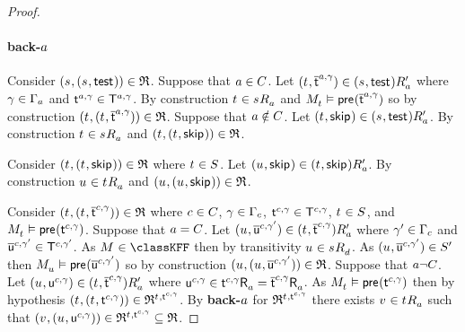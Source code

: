 \begin{proof}
\paragraph{back-$\agentA$}
Consider $(\kStateS, (\kStateS, \aStateTest)) \in \refinement$.
Suppose that $\agentA \in \agentsC$.
Let $(\kStateT, \aPStateT[\agentA, \gamma]) \in \kSuccessorsPA{(\kStateS, \aStateTest)}$ where $\gamma \in \Gamma_\agentA$ and $\aStateT[\agentA, \gamma] \in \aStatesT[\agentA, \gamma]$.
By construction $\kStateT \in \kSuccessorsA{\kStateS}$ and $\kPModel{\kStateT} \entails \aPrecondition(\aPStateT[\agentA, \gamma])$ so by construction $(\kStateT, (\kStateT, \aPStateT[\agentA, \gamma])) \in \refinement$.
Suppose that $\agentA \notin \agentsC$.
Let $(\kStateT, \aStateSkip) \in \kSuccessorsPA{(\kStateS, \aStateTest)}$.
By construction $\kStateT \in \kSuccessorsA{\kStateS}$ and $(\kStateT, (\kStateT, \aStateSkip)) \in \refinement$.

Consider $(\kStateT, (\kStateT, \aStateSkip)) \in \refinement$ where $\kStateT \in \kStates$.
Let $(\kStateU, \aStateSkip) \in \kSuccessorsPA{(\kStateT, \aStateSkip)}$.
By construction $\kStateU \in \kSuccessorsA{\kStateT}$ and $(\kStateU, (\kStateU, \aStateSkip)) \in \refinement$.

Consider $(\kStateT, (\kStateT, \aPStateT[\agentC, \gamma])) \in \refinement$ where $\agentC \in \agentsC$, $\gamma \in \Gamma_\agentC$, $\aStateT[\agentC, \gamma] \in \aStatesT[\agentC, \gamma]$, $\kStateT \in \kStates$, and $\kPModel{\kStateT} \entails \aPrecondition(\aStateT[\agentC, \gamma])$.
Suppose that $\agentA = \agentsC$.
Let $(\kStateU, \aPStateU[\agentC, \gamma']) \in \kSuccessorsPA{(\kStateT, \aPStateT[\agentC, \gamma])}$ where $\gamma' \in \Gamma_\agentC$ and $\aPStateU[\agentC, \gamma'] \in \aStatesT[\agentC, \gamma']$.
As $\kModel \in \classKFF$ then by transitivity $\kStateU \in \kSuccessorsD{\kStateS}$.
As $(\kStateU, \aPStateU[\agentC, \gamma']) \in \kStatesP$ then $\kPModel{\kStateU} \entails \aPrecondition(\aPStateU[\agentC, \gamma'])$ so by construction $(\kStateU, (\kStateU, \aPStateU[\agentC, \gamma'])) \in \refinement$.
Suppose that $\agentA \neg \agentsC$.
Let $(\kStateU, \aStateU[\agentC, \gamma]) \in \kSuccessorsPA{(\kStateT, \aPStateT[\agentC, \gamma])}$ where $\aStateU[\agentC, \gamma] \in \aSuccessorsA{\aStateT[\agentC, \gamma]} = \aSuccessorsA{\aPStateT[\agentC, \gamma]}$.
As $\kPModel{\kStateT} \entails \aPrecondition(\aStateT[\agentC, \gamma])$ then by hypothesis $(\kStateT, (\kStateT, \aStateT[\agentC, \gamma])) \in \refinement^{\kStateT, \aStateT[\agentC, \gamma]}$.
By {\bf back-$\agentA$} for $\refinement^{\kStateT, \aStateT[\agentC, \gamma]}$ there exists $\kStateV \in \kSuccessorsA{\kStateT}$ such that $(\kStateV, (\kStateU, \aStateU[\agentC, \gamma])) \in \refinement^{\kStateT, \aStateT[\agentC, \gamma]} \subseteq \refinement$.


\end{proof}
